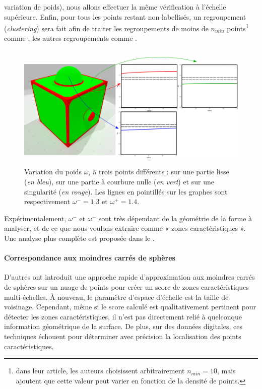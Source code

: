variation de poids), nous allons effectuer la même vérification à l'échelle
supérieure. Enfin, pour tous les points restant non labellisés, un regroupement
(\emph{clustering}) sera fait afin de traiter les regroupements de moins de
$n_{min}$ points\footnote{dans leur article, les auteurs choisissent
arbitrairement $n_{min}=10$, mais ajoutent que cette valeur peut varier en
fonction de la densité de points.} comme \NonFeature, les autres regroupements
comme \Feature.
%
\begin{figure}[ht]{
  \begin{center}
    \includegraphics[height=6cm]{figures/CubeSpherePlotTensor}
  \end{center}}
    \caption[Variation du poids $\omega_i$.]{Variation du poids $\omega_i$ à
    trois points différents : sur une partie lisse (\emph{en bleu}), sur une
    partie à courbure nulle (\emph{en vert}) et sur une singularité (\emph{en
    rouge}). Les lignes en pointillés sur les graphes sont respectivement
    $\omega^- = 1.3$ et $\omega^+ = 1.4$.\label{fig:tensor-cubesphere}}
\end{figure}


Expérimentalement, $\omega^-$ et $\omega^+$ sont très dépendant de la géométrie
de la forme à analyser, et de ce que nous voulons extraire comme « zones
caractéristiques ». Une analyse plus complète est proposée dans le
.
%
\paragraph{Correspondance aux moindres carrés de sphères}%
\label{sec:applications:feature:growing}
%
D'autres \cite{Mellado2012} ont introduit une approche rapide d'approximation
aux moindres carrés de sphères sur un nuage de points pour créer un score de
zones caractéristiques multi-échelles. À nouveau, le paramètre d'espace d'échelle
est la taille de voisinage. Cependant, même si le score calculé est
qualitativement pertinent pour détecter les zones caractéristiques, il n'est pas
directement relié à quelconque information géométrique de la surface. De plus,
sur des données digitales, ces techniques échouent pour déterminer avec
précision la localisation des points caractéristiques.


